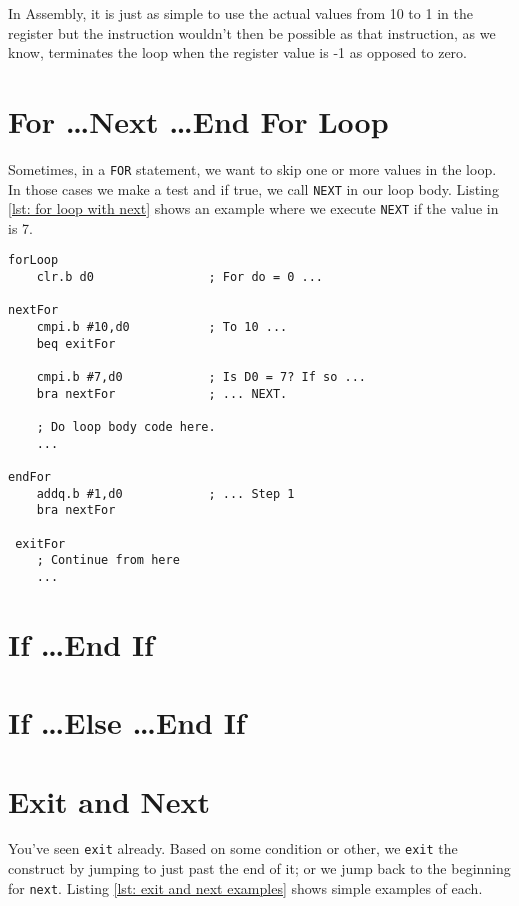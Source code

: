 In Assembly, it is just as simple to use the actual values from 10 to 1 in the register but the  instruction wouldn't then be possible as that instruction, as we know, terminates the loop when the register value is -1 as opposed to zero.

\section{For \ldots\protect Next \ldots\protect End For Loop}

Sometimes, in a \texttt{FOR} statement, we want to skip one or more values in the loop. In those cases we make a test and if true, we call \texttt{NEXT} in our loop body. Listing \ref{lst: for loop with next} shows an example where we execute \texttt{NEXT} if the value in  is 7.

\begin{lstlisting}[caption={For loop with next clause},label={lst: for loop with next}]
forLoop
    clr.b d0                ; For do = 0 ...
    
nextFor
    cmpi.b #10,d0           ; To 10 ...
    beq exitFor
    
    cmpi.b #7,d0            ; Is D0 = 7? If so ...
    bra nextFor             ; ... NEXT.
    
    ; Do loop body code here.
    ...
    
endFor
    addq.b #1,d0            ; ... Step 1
    bra nextFor
    
 exitFor
    ; Continue from here
    ...
\end{lstlisting}

\section{If \ldots\protect End If}

\section{If \ldots\protect Else \ldots\protect End If}

\section{Exit and Next}

You've seen \texttt{exit} already. Based on some condition or other, we \texttt{exit} the construct by jumping to just past the end of it; or we jump back to the beginning for \texttt{next}. Listing \ref{lst: exit and next examples} shows simple examples of each.

